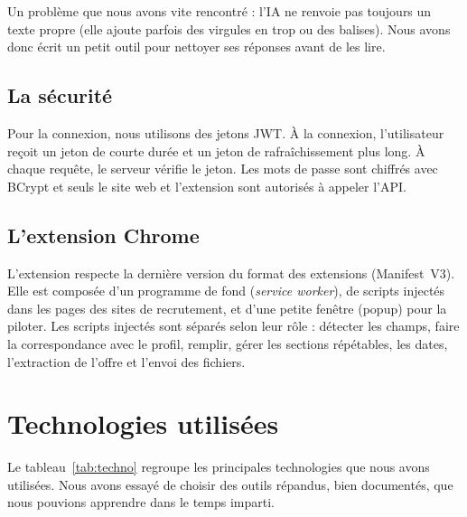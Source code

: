 \documentclass[12pt,a4paper]{report}
\begin{document}
Un probl\`eme que nous avons vite rencontr\'e : l'IA ne renvoie pas toujours un
texte propre (elle ajoute parfois des virgules en trop ou des balises). Nous
avons donc \'ecrit un petit outil pour nettoyer ses r\'eponses avant de les lire.

\section{La s\'ecurit\'e}
Pour la connexion, nous utilisons des jetons JWT. \`A la connexion, l'utilisateur
re\c{c}oit un jeton de courte dur\'ee et un jeton de rafra\^ichissement plus long. \`A
chaque requ\^ete, le serveur v\'erifie le jeton. Les mots de passe sont chiffr\'es
avec BCrypt et seuls le site web et l'extension sont autoris\'es \`a appeler l'API.

\section{L'extension Chrome}
L'extension respecte la derni\`ere version du format des extensions
(Manifest~V3). Elle est compos\'ee d'un programme de fond (\textit{service
worker}), de scripts inject\'es dans les pages des sites de recrutement, et d'une
petite fen\^etre (popup) pour la piloter. Les scripts inject\'es sont s\'epar\'es selon
leur r\^ole : d\'etecter les champs, faire la correspondance avec le profil, remplir,
g\'erer les sections r\'ep\'etables, les dates, l'extraction de l'offre et l'envoi des
fichiers.

\chapter{Technologies utilis\'ees}

Le tableau~\ref{tab:techno} regroupe les principales technologies que nous avons
utilis\'ees. Nous avons essay\'e de choisir des outils r\'epandus, bien document\'es,
que nous pouvions apprendre dans le temps imparti.
\end{document}
